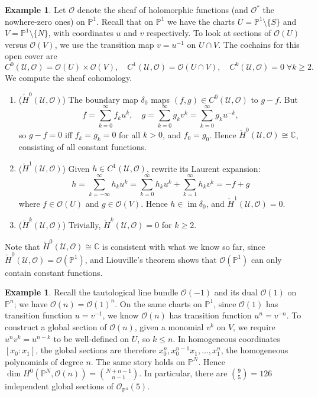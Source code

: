 \documentclass{report}
\theoremstyle{plain}
\theoremstyle{definition}
\newtheorem{example}[theorem]{Example}
\theoremstyle{remark}
\newcommand{\bC}{\mathbb{C}}
\newcommand{\bP}{\mathbb{P}}
\newcommand{\cO}{\mathcal{O}}
\newcommand{\cU}{\mathcal{U}}
\DeclareMathOperator{\im}{im}
\newcommand{\chH}{\check{H}}
\begin{document}
\begin{example}
  Let $\cO$ denote the sheaf of holomorphic functions (and $\cO^*$ the
  nowhere-zero ones) on $\bP^1$. Recall that on $\bP^1$ we have the
  charts $U = \bP^1 \setminus \{S\}$ and $V = \bP^1 \setminus \{N\}$,
  with coordinates $u$ and $v$ respectively. To look at sections of
  $\cO(U)$ versus $\cO(V)$, we use the transition map $v = u^{-1}$ on
  $U \cap V$. The cochains for this open cover are
  \[ C^0(\cU, \cO) = \cO(U) \times \cO(V), \quad C^1(\cU, \cO) = \cO(U \cap V), \quad C^k(\cU, \cO) = 0 \; \forall k \ge 2. \]
  We compute the sheaf cohomology.
  \begin{enumerate}
  \item ($\chH^0(\cU, \cO)$) The boundary map $\delta_0$ maps $(f, g)
    \in C^0(\cU, \cO)$ to $g - f$. But
    \[ f = \sum_{k=0}^\infty f_k u^k, \quad g = \sum_{k=0}^\infty g_k v^k = \sum_{k=0}^\infty g_k u^{-k}, \]
    so $g - f = 0$ iff $f_k = g_k = 0$ for all $k > 0$, and $f_0 =
    g_0$. Hence $\chH^0(\cU, \cO) \cong \bC$, consisting of all
    constant functions.
  \item ($\chH^1(\cU, \cO)$) Given $h \in C^1(\cU, \cO)$, rewrite its
    Laurent expansion:
    \[ h = \sum_{k=-\infty}^\infty h_k u^k = \sum_{k=0}^\infty h_k u^k + \sum_{k=1}^{\infty} h_k v^k = -f + g \]
    where $f \in \cO(U)$ and $g \in \cO(V)$. Hence $h \in \im
    \delta_0$, and $\chH^1(\cU, \cO) = 0$.
  \item ($\chH^k(\cU, \cO)$) Trivially, $\chH^k(\cU, \cO) = 0$ for $k
    \ge 2$.
  \end{enumerate}
  Note that $\chH^0(\cU, \cO) \cong \bC$ is consistent with what we
  know so far, since $\chH^0(\cU, \cO) = \cO(\bP^1)$, and Liouville's
  theorem shows that $\cO(\bP^1)$ can only contain constant functions.
\end{example}

\begin{example} \label{ex:quintics-dim}
  Recall the tautological line bundle $\cO(-1)$ and its dual $\cO(1)$
  on $\bP^n$; we have $\cO(n) = \cO(1)^n$. On the same charts on
  $\bP^1$, since $\cO(1)$ has transition function $u = v^{-1}$, we
  know $\cO(n)$ has transition function $u^n = v^{-n}$. To construct a
  global section of $\cO(n)$, given a monomial $v^k$ on $V$, we
  require $u^n v^k = u^{n-k}$ to be well-defined on $U$, so $k \le n$.
  In homogeneous coordinates $[x_0 : x_1]$, the global sections are
  therefore $x_0^n, x_0^{n-1}x_1, \ldots, x_1^n$, the homogeneous
  polynomials of degree $n$. The same story holds on $\bP^N$. Hence
  $\dim H^0(\bP^N, \cO(n)) = \binom{N+n-1}{n-1}$. In particular, there
  are $\binom{9}{5} = 126$ independent global sections of
  $\cO_{\bP^4}(5)$.
\end{example}
\end{document}

